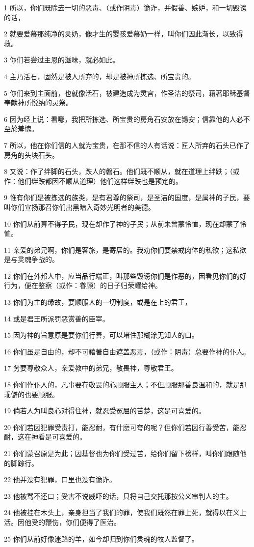 \par 1 所以，你们既除去一切的恶毒、（或作阴毒）诡诈，并假善、嫉妒，和一切毁谤的话，
\par 2 就要爱慕那纯净的灵奶，像才生的婴孩爱慕奶一样，叫你们因此渐长，以致得救。
\par 3 你们若尝过主恩的滋味，就必如此。
\par 4 主乃活石，固然是被人所弃的，却是被神所拣选、所宝贵的。
\par 5 你们来到主面前，也就像活石，被建造成为灵宫，作圣洁的祭司，藉著耶稣基督奉献神所悦纳的灵祭。
\par 6 因为经上说：看哪，我把所拣选、所宝贵的房角石安放在锡安；信靠他的人必不至於羞愧。
\par 7 所以，他在你们信的人就为宝贵，在那不信的人有话说：匠人所弃的石头已作了房角的头块石头。
\par 8 又说：作了绊脚的石头，跌人的磐石。他们既不顺从，就在道理上绊跌；（或作：他们绊跌都因不顺从道理）他们这样绊跌也是预定的。
\par 9 惟有你们是被拣选的族类，是有君尊的祭司，是圣洁的国度，是属神的子民，要叫你们宣扬那召你们出黑暗入奇妙光明者的美德。
\par 10 你们从前算不得子民，现在却作了神的子民；从前未曾蒙怜恤，现在却蒙了怜恤。
\par 11 亲爱的弟兄啊，你们是客旅，是寄居的。我劝你们要禁戒肉体的私欲；这私欲是与灵魂争战的。
\par 12 你们在外邦人中，应当品行端正，叫那些毁谤你们是作恶的，因看见你们的好行为，便在鉴察（或作：眷顾）的日子归荣耀给神。
\par 13 你们为主的缘故，要顺服人的一切制度，或是在上的君王，
\par 14 或是君王所派罚恶赏善的臣宰。
\par 15 因为神的旨意原是要你们行善，可以堵住那糊涂无知人的口。
\par 16 你们虽是自由的，却不可藉著自由遮盖恶毒，（或作：阴毒）总要作神的仆人。
\par 17 务要尊敬众人，亲爱教中的弟兄，敬畏神，尊敬君王。
\par 18 你们作仆人的，凡事要存敬畏的心顺服主人；不但顺服那善良温和的，就是那乖僻的也要顺服。
\par 19 倘若人为叫良心对得住神，就忍受冤屈的苦楚，这是可喜爱的。
\par 20 你们若因犯罪受责打，能忍耐，有什麽可夸的呢？但你们若因行善受苦，能忍耐，这在神看是可喜爱的。
\par 21 你们蒙召原是为此；因基督也为你们受过苦，给你们留下榜样，叫你们跟随他的脚踪行。
\par 22 他并没有犯罪，口里也没有诡诈。
\par 23 他被骂不还口；受害不说威吓的话，只将自己交托那按公义审判人的主。
\par 24 他被挂在木头上，亲身担当了我们的罪，使我们既然在罪上死，就得以在义上活。因他受的鞭伤，你们便得了医治。
\par 25 你们从前好像迷路的羊，如今却归到你们灵魂的牧人监督了。

